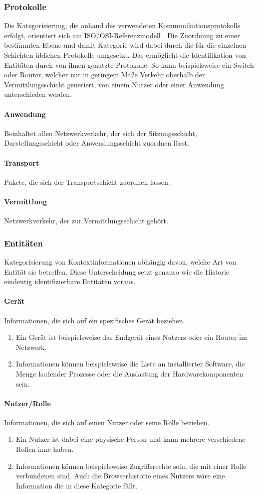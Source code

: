 \subsubsection{Protokolle}
Die Kategorisierung, die anhand des verwendeten Kommunikationsprotokolls erfolgt, orientiert sich am ISO/OSI-Referenzmodell \cite{day1983osi}. Die Zuordnung zu einer bestimmten Ebene und damit Kategorie wird dabei durch die für die einzelnen Schichten üblichen Protokolle umgesetzt. Das ermöglicht die Identifikation von Entitäten durch von ihnen genutzte Protokolle. So kann beispielsweise ein Switch oder Router, welcher nur in geringem Maße Verkehr oberhalb der Vermittlungsschicht generiert, von einem Nutzer oder einer Anwendung unterschieden werden.
\paragraph{Anwendung}
Beinhaltet allen Netzwerkverkehr, der sich der Sitzungsschicht, Darstellungsschicht oder Anwendungsschicht zuordnen lässt. 
\paragraph{Transport}
Pakete, die sich der Transportschicht zuordnen lassen.
\paragraph{Vermittlung}
Netzwerkverkehr, der zur Vermittlungsschicht gehört.
\subsubsection{Entitäten}
Kategorisierung von Kontextinformationen abhängig davon, welche Art von Entität sie betreffen.
Diese Unterscheidung setzt genauso wie die Historie eindeutig identifizierbare Entitäten voraus.
\paragraph{Gerät}
Informationen, die sich auf ein spezifisches Gerät beziehen.
\begin{enumerate}
\item{Ein Gerät ist beispielsweise das Endgerät eines Nutzers oder ein Router im Netzwerk. }
\item{Informationen können beispielsweise die Liste an installierter Software, die Menge laufender Prozesse oder die Auslastung der Hardwarekomponenten sein.}
\end{enumerate}
\paragraph{Nutzer/Rolle}
Informationen, die sich auf einen Nutzer oder seine Rolle beziehen.
\begin{enumerate}
\item{Ein Nutzer ist dabei eine physische Person und kann mehrere verschiedene Rollen inne haben. }
\item{Informationen können beispielsweise Zugriffsrechte sein, die mit einer Rolle verbundenen sind. Auch die Browserhistorie eines Nutzers wäre eine Information die in diese Kategorie fällt.}
\end{enumerate}

